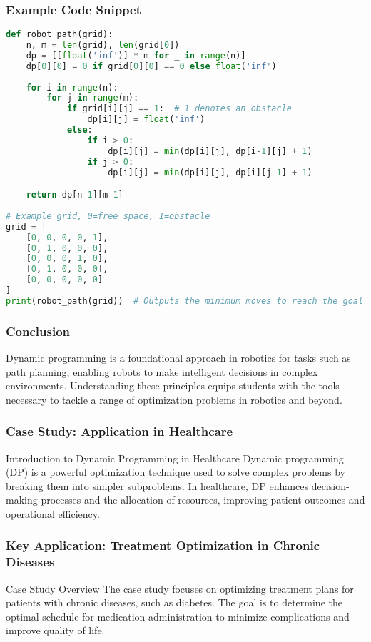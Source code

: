 \documentclass[aspectratio=169]{beamer}
\begin{document}
\begin{frame}[fragile]
  \frametitle{Example Code Snippet}
  
  \begin{lstlisting}[language=Python]
def robot_path(grid):
    n, m = len(grid), len(grid[0])
    dp = [[float('inf')] * m for _ in range(n)]
    dp[0][0] = 0 if grid[0][0] == 0 else float('inf')
    
    for i in range(n):
        for j in range(m):
            if grid[i][j] == 1:  # 1 denotes an obstacle
                dp[i][j] = float('inf')
            else:
                if i > 0:
                    dp[i][j] = min(dp[i][j], dp[i-1][j] + 1)
                if j > 0:
                    dp[i][j] = min(dp[i][j], dp[i][j-1] + 1)

    return dp[n-1][m-1]
  
# Example grid, 0=free space, 1=obstacle
grid = [
    [0, 0, 0, 0, 1],
    [0, 1, 0, 0, 0],
    [0, 0, 0, 1, 0],
    [0, 1, 0, 0, 0],
    [0, 0, 0, 0, 0]
]
print(robot_path(grid))  # Outputs the minimum moves to reach the goal
  \end{lstlisting}
\end{frame}

\begin{frame}[fragile]
  \frametitle{Conclusion}
  Dynamic programming is a foundational approach in robotics for tasks such as path planning, enabling robots to make intelligent decisions in complex environments. Understanding these principles equips students with the tools necessary to tackle a range of optimization problems in robotics and beyond.
\end{frame}

\begin{frame}[fragile]
    \frametitle{Case Study: Application in Healthcare}
    \begin{block}{Introduction to Dynamic Programming in Healthcare}
        Dynamic programming (DP) is a powerful optimization technique used to solve complex problems by breaking them into simpler subproblems.
        In healthcare, DP enhances decision-making processes and the allocation of resources, improving patient outcomes and operational efficiency.
    \end{block}
\end{frame}

\begin{frame}[fragile]
    \frametitle{Key Application: Treatment Optimization in Chronic Diseases}
    \begin{block}{Case Study Overview}
        The case study focuses on optimizing treatment plans for patients with chronic diseases, such as diabetes.
        The goal is to determine the optimal schedule for medication administration to minimize complications and improve quality of life.
    \end{block}
\end{frame}
\end{document}
